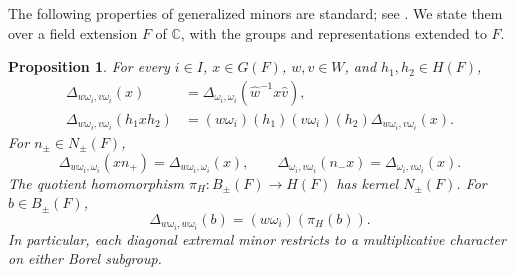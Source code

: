 \documentclass[11pt,leqno]{amsart}
\numberwithin{equation}{section}
\theoremstyle{plain}
\newtheorem{proposition}[theorem]{Proposition}
\theoremstyle{definition}
\theoremstyle{plain}
\theoremstyle{definition}
\theoremstyle{remark}
\begin{document}
The following properties of generalized minors are standard; see \cite[Sections~1.4 and~2.3]{FominZelevinsky1999}.  We state them over a field extension $F$ of $\mathbb C$, with the groups and representations extended to $F$.
\begin{proposition}\label{prop:minor-covariance}
For every $i\in I$, $x\in G(F)$, $w,v\in W$, and $h_1,h_2\in H(F)$,
\begin{align*}
 \Delta_{w\omega_i,v\omega_i}(x)
 &=\Delta_{\omega_i,\omega_i}(\widehat w^{-1}x\widehat v),\\
 \Delta_{w\omega_i,v\omega_i}(h_1xh_2)
 &=(w\omega_i)(h_1)(v\omega_i)(h_2)
       \Delta_{w\omega_i,v\omega_i}(x).
\end{align*}
For $n_\pm\in N_\pm(F)$,
\[
 \Delta_{w\omega_i,\omega_i}(xn_+)
 =\Delta_{w\omega_i,\omega_i}(x),\qquad
 \Delta_{\omega_i,v\omega_i}(n_-x)
 =\Delta_{\omega_i,v\omega_i}(x).
\]
The quotient homomorphism $\pi_H:B_\pm(F)\to H(F)$ has kernel $N_\pm(F)$.  For $b\in B_\pm(F)$,
\[
 \Delta_{w\omega_i,w\omega_i}(b)=(w\omega_i)(\pi_H(b)).
\]
In particular, each diagonal extremal minor restricts to a multiplicative character on either Borel subgroup.
\end{proposition}
\end{document}

